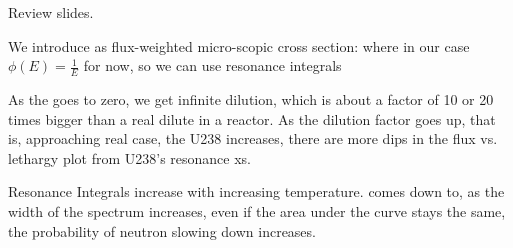 \documentclass{school-22.211-notes}
\date{February 22, 2012}
\begin{document}
\maketitle

Review slides. 

We introduce  as flux-weighted micro-scopic cross section:
where in our case $\phi (E) = \frac{1}{E}$ for now, so we can use resonance integrals 

As the  goes to zero, we get infinite dilution, which is about a factor of 10 or 20 times bigger than a real dilute in a reactor. As the dilution factor goes up, that is, approaching real case, the U238 increases, there are more dips in the flux vs. lethargy plot from U238's resonance xs. 

Resonance Integrals increase with increasing temperature.  comes down to, as the width of the spectrum increases, even if the area under the curve stays the same, the probability of neutron slowing down increases. 




\end{document}
